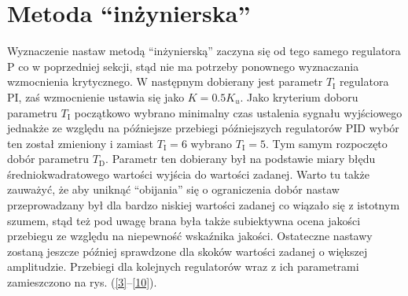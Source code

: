 \section{Metoda ``inżynierska''}
Wyznaczenie nastaw metodą ``inżynierską'' zaczyna się od tego samego regulatora P co w poprzedniej sekcji, stąd nie ma potrzeby ponownego wyznaczania wzmocnienia krytycznego. W następnym dobierany jest parametr $T_\mathrm{I}$ regulatora PI, zaś wzmocnienie ustawia się jako $K = \num{0.5}K_u$. Jako kryterium doboru parametru $T_\mathrm{I}$ początkowo wybrano minimalny czas ustalenia sygnału wyjściowego jednakże ze względu na późniejsze przebiegi późniejszych regulatorów PID wybór ten został zmieniony i zamiast $T_\mathrm{I} = 6$ wybrano $T_\mathrm{I} = 5$. Tym samym rozpoczęto dobór parametru $T_\mathrm{D}$. Parametr ten dobierany był na podstawie miary błędu średniokwadratowego wartości wyjścia do wartości zadanej. Warto tu także zauważyć, że aby uniknąć ``obijania'' się o ograniczenia dobór nastaw przeprowadzany był dla bardzo niskiej wartości zadanej co wiązało się z istotnym szumem, stąd też pod uwagę brana była także subiektywna ocena jakości przebiegu ze względu na niepewność wskaźnika jakości. Ostateczne nastawy zostaną jeszcze później sprawdzone dla skoków wartości zadanej o większej amplitudzie. Przebiegi dla kolejnych regulatorów wraz z ich parametrami zamieszczono na rys. (\ref{3}--\ref{10}).

\begin{figure}[H]
\centering

\label{R3}
\end{figure}

\begin{figure}[H]
\centering

\label{R4}
\end{figure}

\begin{figure}[H]
\centering

\label{R5}
\end{figure}

\begin{figure}[H]
\centering

\label{R6}
\end{figure}

\begin{figure}[H]
\centering

\label{R7}
\end{figure}


\begin{figure}[H]
\centering

\label{R8}
\end{figure}

